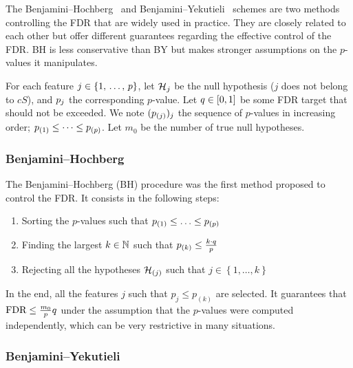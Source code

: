 The Benjamini–Hochberg~\cite{bh} and Benjamini–Yekutieli~\cite{by} schemes are two methods controlling the FDR
that are widely used in practice.
They are closely related to each other but offer different guarantees regarding the effective control of the FDR\@.
BH is less conservative than BY but makes stronger assumptions on the $p$-values it manipulates.

For each feature $j \in \left\{ 1,\, \dots,\, p \right\}$, let $\mathcal{H}_j$ be the null hypothesis ($j$ does not belong to $cS$),
and $p_j$ the corresponding $p$-value.
Let $q \in [0, 1]$ be some FDR target that should not be exceeded.
We note $(p_{(j)})_j$ the sequence of $p$-values in increasing order;
$p_{(1)} \leq \dots \leq p_{(p)}$.
Let $m_0$ be the number of true null hypotheses.

\subsubsection{Benjamini–Hochberg}\label{subsubsec:bh}

The Benjamini–Hochberg (BH) procedure was the first method proposed to control the FDR\@.
It consists in the following steps:
\begin{enumerate}
    \item Sorting the $p$-values such that $p_{(1)} \leq \ldots \leq p_{(p)}$
    \item Finding the largest $k \in \mathbb{N}$ such that $p_{(k)} \leq \frac{k \cdot q}{p}$
    \item Rejecting all the hypotheses $\mathcal{H}_{(j)}$ such that $j \in \left\{ 1, \dots, k \right\}$
\end{enumerate}
In the end, all the features $j$ such that $p_j \leq p_{(k)}$ are selected.
It guarantees that $\text{FDR} \leq \frac{m_0}{p}q$ under the assumption that the $p$-values were computed
independently, which can be very restrictive in many situations.

\subsubsection{Benjamini–Yekutieli}\label{subsubsec:by}

